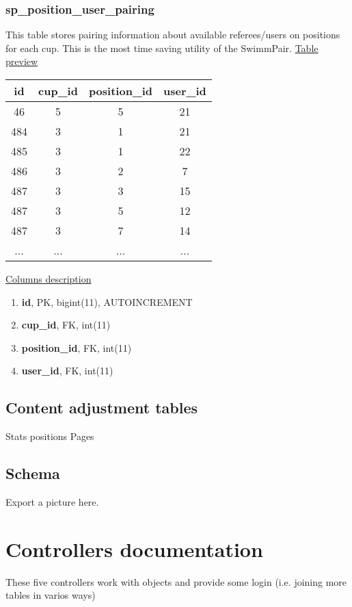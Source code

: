 \subsubsection*{sp\_position\_user\_pairing}
This table stores pairing information about available referees/users on positions for each cup. This is the most time saving utility of the SwimmPair.
\newline
\underline{Table preview}
\begin{center}
 \begin{tabular}{||c c c c||} 
 \hline
 id & cup\_id & position\_id & user\_id  \\ [0.5ex] 
 \hline\hline
 46 & 5 & 5 & 21 \\ 
 \hline
 484 & 3 & 1 & 21 \\ 
 \hline
 485 & 3 & 1 & 22 \\ 
 \hline
 486 & 3 & 2 & 7 \\
 \hline
 487 & 3 & 3 & 15 \\
 \hline
 487 & 3 & 5 & 12 \\
 \hline
 487 & 3 & 7 & 14 \\
 \hline
 ... & ... & ... & ... \\ [1ex] 
 \hline
\end{tabular}
\end{center}
\underline{Columns description}
\begin{enumerate}
  \setlength\itemsep{0em}
  \item \textbf{id}, PK, bigint(11), AUTOINCREMENT
  \item \textbf{cup\_id}, FK, int(11)
  \item \textbf{position\_id}, FK, int(11)
  \item \textbf{user\_id}, FK, int(11)
\end{enumerate}
\subsection{Content adjustment tables}
Stats positions
Pages
\subsection{Schema}
Export a picture here.
\section{Controllers documentation}
\par These five controllers work with objects and provide some login (i.e. joining more tables in varios ways)
